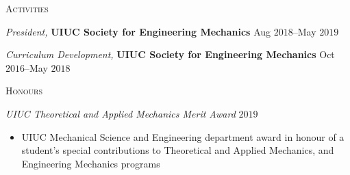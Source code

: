 \documentclass[10pt]{article}
\begin{document}
\begin{multicols}{2}
\textsc{Activities}
\columnbreak

\textit{President,} \textbf{UIUC Society for Engineering Mechanics} \hfill Aug $2018$--May $2019$

\vspace{-0.75em}

%
\textit{Curriculum Development,} \textbf{UIUC Society for Engineering Mechanics} \hfill Oct $2016$--May $2018$

%
\end{multicols}
\vspace{-1.5em} 
\begin{multicols}{2}
\textsc{Honours}
\columnbreak

\textit{UIUC Theoretical and Applied Mechanics Merit Award} \hfill $2019$

\vspace{-1.75em}
\begin{itemize}[label= ]
    \setlength{\itemindent}{-2.50em}
    \item[]  UIUC Mechanical Science and Engineering department award in honour of a student's special contributions to Theoretical and Applied Mechanics, and Engineering Mechanics programs
\end{itemize}
\vspace{-2.0em}

\end{multicols}
\end{document}
